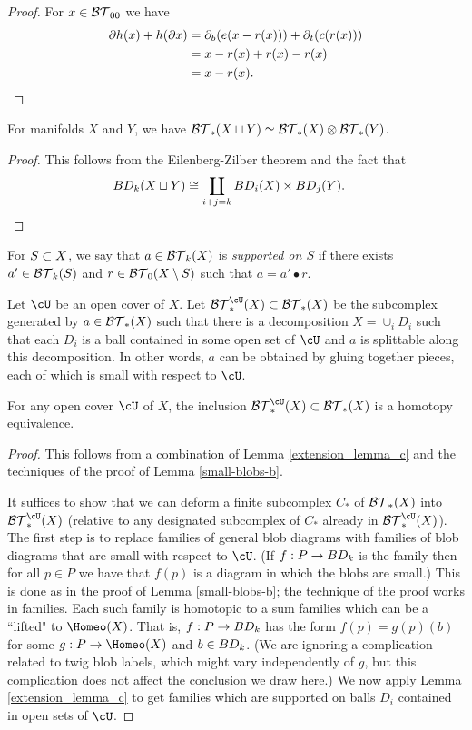 \begin{proof}
For $x\in {\mathcal{BT}}_{00}$ we have
\begin{align*}
	\partial h(x) + h(\partial x) &= \partial_b(e(x - r(x))) + \partial_t(c(r(x))) \\
			&= x - r(x) + r(x) - r(x)\\
			&= x - r(x). \qedhere
\end{align*}
\end{proof}

\begin{lemma} \label{btc-prod}
For manifolds $X$ and $Y$, we have ${\mathcal{BT}}_*(X\sqcup Y) \simeq {\mathcal{BT}}_*(X)\otimes{\mathcal{BT}}_*(Y)$.
\end{lemma}
\begin{proof}
This follows from the Eilenberg-Zilber theorem and the fact that
\begin{align*}
	BD_k(X\sqcup Y) & \cong \coprod_{i+j=k} BD_i(X)\times BD_j(Y) . \qedhere
\end{align*}
\end{proof}

For $S\subset X$, we say that $a\in {\mathcal{BT}}_k(X)$ is {\it supported on $S$}
if there exists $a'\in {\mathcal{BT}}_k(S)$
and $r\in {\mathcal{BT}}_0(X\setminus S)$ such that $a = a'\bullet r$.

\newcommand\sbtc{\btc^{\cU}}
Let $\cU$ be an open cover of $X$.
Let $\sbtc_*(X)\sub\btc_*(X)$ be the subcomplex generated by
$a\in {\mathcal{BT}}_*(X)$ such that there is a decomposition $X = \cup_i D_i$
such that each $D_i$ is a ball contained in some open set of $\cU$ and
$a$ is splittable along this decomposition.
In other words, $a$ can be obtained by gluing together pieces, each of which
is small with respect to $\cU$.

\begin{lemma} \label{small-top-blobs}
For any open cover $\cU$ of $X$, the inclusion $\sbtc_*(X)\sub\btc_*(X)$
is a homotopy equivalence.
\end{lemma}
\begin{proof}
This follows from a combination of Lemma \ref{extension_lemma_c} and the techniques of
the proof of Lemma \ref{small-blobs-b}.

It suffices to show that we can deform a finite subcomplex $C_*$ of ${\mathcal{BT}}_*(X)$ into $\sbtc_*(X)$
(relative to any designated subcomplex of $C_*$ already in $\sbtc_*(X)$).
The first step is to replace families of general blob diagrams with families 
of blob diagrams that are small with respect to $\cU$.
(If $f:P \to BD_k$ is the family then for all $p\in P$ we have that $f(p)$ is a diagram in which the blobs are small.)
This is done as in the proof of Lemma \ref{small-blobs-b}; the technique of the proof works in families.
Each such family is homotopic to a sum families which can be a ``lifted" to $\Homeo(X)$.
That is, $f:P \to BD_k$ has the form $f(p) = g(p)(b)$ for some $g:P\to \Homeo(X)$ and $b\in BD_k$.
(We are ignoring a complication related to twig blob labels, which might vary
independently of $g$, but this complication does not affect the conclusion we draw here.)
We now apply Lemma \ref{extension_lemma_c} to get families which are supported 
on balls $D_i$ contained in open sets of $\cU$.
\end{proof}


